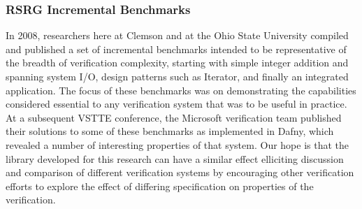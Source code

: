 \subsubsection{RSRG Incremental Benchmarks}\label{sec:rsrgbenchmarks}
In 2008, researchers here at Clemson and at the Ohio State University compiled and published\cite{VSTTEBenchmarks} a set of incremental benchmarks intended to be representative of the breadth of verification complexity, starting with simple integer addition and spanning system I/O, design patterns such as Iterator, and finally an integrated application.  The focus of these benchmarks was on demonstrating the capabilities considered essential to any verification system that was to be useful in practice.  At a subsequent VSTTE conference, the Microsoft verification team published their solutions to some of these benchmarks as implemented in Dafny\cite{DafnyBenchmarks}, which revealed a number of interesting properties of that system.  Our hope is that the library developed for this research can have a similar effect elliciting discussion and comparison of different verification systems by encouraging other verification efforts to explore the effect of differing specification on properties of the verification.
